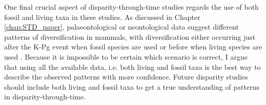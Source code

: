 One final crucial aspect of disparity-through-time studies regards the use of both fossil and living taxa in these studies.
As discussed in Chapter \ref{chap:STD_paper}, palaeontological or neontological data suggest different patterns of diversification in mammals, with diversification either occurring just after the K-Pg event when fossil species are used \citep[suggesting an effect of K-Pg;][]{O'Leary08022013} or before when living species are used \citep[rejecting an effect of K-Pg;][]{meredithimpacts2011,dosReis2014}.
Because it is impossible to be certain which scenario is correct, I argue that using all the available data, i.e. both living and fossil taxa \citep{Slater2012MEE,beckancient2014} is the best way to describe the observed patterns with more confidence.
Future disparity studies should include both living and fossil taxa to get a true understanding of patterns in disparity-through-time.

